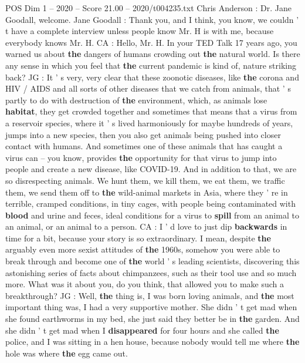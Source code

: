 \begin{textsample}{POS Dim 1 – 2020 – Score 21.00 – 2020/t004235.txt}  \label{ex:f1_pos_073}
Chris Anderson : Dr.
Jane Goodall, welcome.
Jane Goodall : Thank you, and I think, you know, we couldn ' t have a complete interview unless people know Mr.
H is with me, because everybody knows Mr.
H.
CA : Hello, Mr.
H.
In your TED Talk 17 years ago, you warned us about \textbf{the} dangers of humans crowding out \textbf{the} natural world.
Is there any sense in which you feel that \textbf{the} current pandemic is kind of, nature striking back?
JG : It ' s very, very clear that these zoonotic diseases, like \textbf{the} corona and HIV / AIDS and all sorts of other diseases that we catch from animals, that ' s partly to do with destruction of \textbf{the} environment, which, as animals lose \textbf{habitat}, they get crowded together and sometimes that means that a virus from a reservoir species, where it ' s lived harmoniously for maybe hundreds of years, jumps into a new species, then you also get animals being pushed into closer contact with humans.
And sometimes one of these animals that has caught a virus can -- you know, provides \textbf{the} opportunity for that virus to jump into people and create a new disease, like COVID-19.
And in addition to that, we are so disrespecting animals.
We hunt them, we kill them, we eat them, we traffic them, we send them off to \textbf{the} wild-animal markets in Asia, where they ' re in terrible, cramped conditions, in tiny cages, with people being contaminated with \textbf{blood} and urine and feces, ideal conditions for a virus to \textbf{spill} from an animal to an animal, or an animal to a person.
CA : I ' d love to just dip \textbf{backwards} in time for a bit, because your story is so extraordinary.
I mean, despite \textbf{the} arguably even more sexist attitudes of \textbf{the} 1960s, somehow you were able to break through and become one of \textbf{the} world ' s leading scientists, discovering this astonishing series of facts about chimpanzees, such as their tool use and so much more.
What was it about you, do you think, that allowed you to make such a breakthrough?
JG : Well, \textbf{the} thing is, I was born loving animals, and \textbf{the} most important thing was, I had a very supportive mother.
She didn ' t get mad when she found earthworms in my bed, she just said they better be in \textbf{the} garden.
And she didn ' t get mad when I \textbf{disappeared} for four hours and she called \textbf{the} police, and I was sitting in a hen house, because nobody would tell me where \textbf{the} hole was where \textbf{the} egg came out.

\end{textsample}
